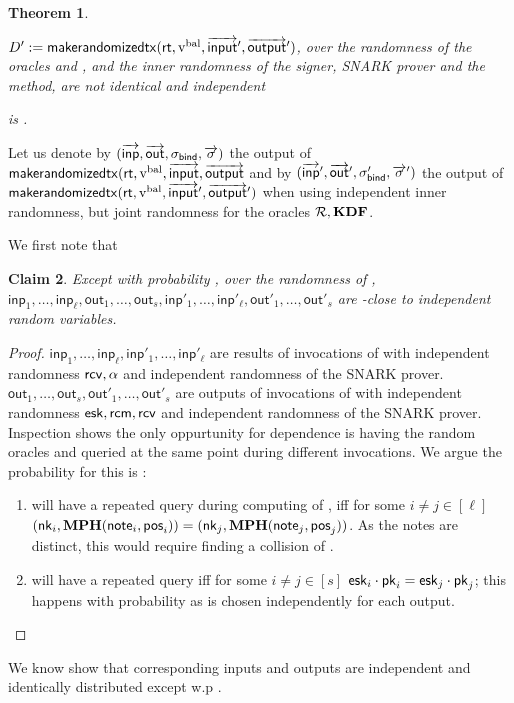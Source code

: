 \documentclass[11pt]{article}
\numberwithin{equation}{section} %
\numberwithin{figure}{section} %
\newtheorem{thm}{Theorem}[section]
\newtheorem{claim}[thm]{Claim}
\newcommand{\inp}{\ensuremath{\mathsf{inp}}\xspace}
\newcommand{\inps}{\ensuremath{\overrightarrow{\mathsf{inp}}}\xspace}
\newcommand{\outs}{\ensuremath{\overrightarrow{\mathsf{out}}}\xspace}
\newcommand{\out}{\ensuremath{\mathsf{out}}\xspace}
\begin{document}
\begin{thm}
\begin{itemize}
$D':= \mathsf{makerandomizedtx}(\mathsf{rt},\mathrm{v^{bal}},\overrightarrow{\mathsf{input}}',\overrightarrow{\mathsf{output}}')$,
over the randomness of the oracles \RO and \KDF, and the inner randomness of the signer, SNARK prover and the \makerandomizedtx method,
are not identical and independent
\end{itemize}
is \negl.

\end{thm}
Let us denote by $(\inps,\outs,\sigval,\sigs)$ the output of $\mathsf{makerandomizedtx}(\mathsf{rt},\mathrm{v^{bal}},\overrightarrow{\mathsf{input}},\overrightarrow{\mathsf{output}}$
and by $(\inps',\outs',\sigval',\sigs')$ the output of $\mathsf{makerandomizedtx}(\mathsf{rt},\mathrm{v^{bal}},\overrightarrow{\mathsf{input}}',\overrightarrow{\mathsf{output}}')$
when using independent inner randomness, but joint randomness for the oracles $\mathcal R,\mathbf{KDF}$.

We first note that
\begin{claim}\label{clm:ind_of_inputs}
Except with probability \negl, over the randomness of \adv,
 $\inp_1,\ldots,\inp_\ell,\out_1,\ldots,\out_s,\inp'_1,\ldots,\inp'_\ell,\out'_1,\ldots,\out'_s$ are \negl-close to independent random variables.
\end{claim}

\begin{proof}
$\inp_1,\ldots,\inp_\ell,\inp'_1,\ldots,\inp'_\ell$
are results of invocations of \makeinput with independent randomness
$\mathsf{rcv},\alpha$ and independent randomness of the SNARK prover.
$\out_1,\ldots,\out_s,\out'_1,\ldots,\out'_s$ are outputs of invocations of \makerandomizedoutput with
independent randomness $\mathsf{esk},\mathsf{rcm},\mathsf{rcv}$ and independent randomness of the SNARK prover.
Inspection shows the only oppurtunity for dependence is having 
the random oracles \KDF and \RO queried at the same point during different invocations.
We argue the probability for this is \negl:
\begin{enumerate}
 \item \RO will have a repeated query during computing of \nf, iff for some $i\neq j\in [\ell]$ 
 $(\mathsf{nk}_i,\mathbf{MPH}(\mathsf{note}_i,\mathsf{pos}_i)) =(\mathsf{nk}_j,\mathbf{MPH}(\mathsf{note}_j,\mathsf{pos}_j))$.
 As the notes are distinct, this would require finding a collision of \MPH.
 \item \KDF will have a repeated query iff for some $i\neq j \in [s]$
 $\mathsf{esk}_i\cdot \mathsf{pk}_i = \mathsf{esk}_j \cdot \mathsf{pk}_j$; this happens with \negl probability as \esk is chosen independently for
 each output.
\end{enumerate}

\end{proof}

We know show that corresponding inputs and outputs are independent and identically distributed except w.p \negl.
\end{document}
